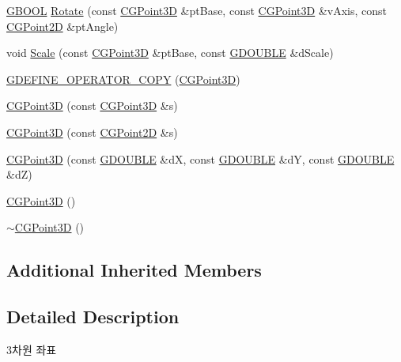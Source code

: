 \begin{DoxyCompactItemize}
\item 
\hyperlink{_g_types_8h_a2901915743626352a6820c5405f556dc}{G\+B\+O\+O\+L} \hyperlink{class_c_g_point3_d_a85f6d37d87b77b71012fb69cb3428bf6}{Rotate} (const \hyperlink{class_c_g_point3_d}{C\+G\+Point3\+D} \&pt\+Base, const \hyperlink{class_c_g_point3_d}{C\+G\+Point3\+D} \&v\+Axis, const \hyperlink{class_c_g_point2_d}{C\+G\+Point2\+D} \&pt\+Angle)
\item 
void \hyperlink{class_c_g_point3_d_a0e527ad58e7aea172f1f1c1f2e2b13d5}{Scale} (const \hyperlink{class_c_g_point3_d}{C\+G\+Point3\+D} \&pt\+Base, const \hyperlink{_g_types_8h_afd05ac85f90ee8e2a733928545462cd4}{G\+D\+O\+U\+B\+L\+E} \&d\+Scale)
\item 
\hyperlink{class_c_g_point3_d_ae112d1f6ce37d8e3173f6914d599b347}{G\+D\+E\+F\+I\+N\+E\+\_\+\+O\+P\+E\+R\+A\+T\+O\+R\+\_\+\+C\+O\+P\+Y} (\hyperlink{class_c_g_point3_d}{C\+G\+Point3\+D})
\item 
\hyperlink{class_c_g_point3_d_aacbbf55c857709e106c556eb1af3fa9a}{C\+G\+Point3\+D} (const \hyperlink{class_c_g_point3_d}{C\+G\+Point3\+D} \&s)
\item 
\hyperlink{class_c_g_point3_d_a711808a7010e51d2714a8a77770425e2}{C\+G\+Point3\+D} (const \hyperlink{class_c_g_point2_d}{C\+G\+Point2\+D} \&s)
\item 
\hyperlink{class_c_g_point3_d_ad586c55053fca8d5fc90c9894c830f40}{C\+G\+Point3\+D} (const \hyperlink{_g_types_8h_afd05ac85f90ee8e2a733928545462cd4}{G\+D\+O\+U\+B\+L\+E} \&d\+X, const \hyperlink{_g_types_8h_afd05ac85f90ee8e2a733928545462cd4}{G\+D\+O\+U\+B\+L\+E} \&d\+Y, const \hyperlink{_g_types_8h_afd05ac85f90ee8e2a733928545462cd4}{G\+D\+O\+U\+B\+L\+E} \&d\+Z)
\item 
\hyperlink{class_c_g_point3_d_a1c13b3569338821022225f516e153203}{C\+G\+Point3\+D} ()
\item 
\hyperlink{class_c_g_point3_d_aca76bbdc5fbb60318cf041f5f721c81b}{$\sim$\+C\+G\+Point3\+D} ()
\end{DoxyCompactItemize}
\subsection*{Additional Inherited Members}


\subsection{Detailed Description}

\begin{DoxyItemize}
\item 3차원 좌표 
\end{DoxyItemize}


